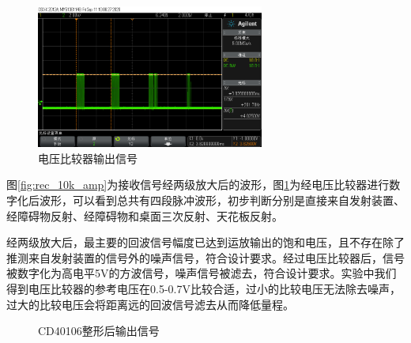 \documentclass[a4paper, twocolumn]{ctexart}
\begin{document}
\begin{figure}[ht]
    \centering
    \includegraphics[width=7.5cm]{../assets/recvcomp_65.png}
    \caption{电压比较器输出信号}
    \label{fig:rec_cmp}
\end{figure}

图\ref{fig:rec_10k_amp}为接收信号经两级放大后的波形，图\ref{fig:rec_cmp}为经电压比较器进行数字化后波形，可以看到总共有四段脉冲波形，初步判断分别是直接来自发射装置、经障碍物反射、经障碍物和桌面三次反射、天花板反射。

经两级放大后，最主要的回波信号幅度已达到运放输出的饱和电压，且不存在除了推测来自发射装置的信号外的噪声信号，符合设计要求。经过电压比较器后，信号被数字化为高电平5V的方波信号，噪声信号被滤去，符合设计要求。实验中我们得到电压比较器的参考电压在0.5-0.7V比较合适，过小的比较电压无法除去噪声，过大的比较电压会将距离远的回波信号滤去从而降低量程。

\begin{figure}[ht]
    \centering
    \caption{CD40106整形后输出信号}
    \label{fig:rec_40106}
\end{figure}
\end{document}
